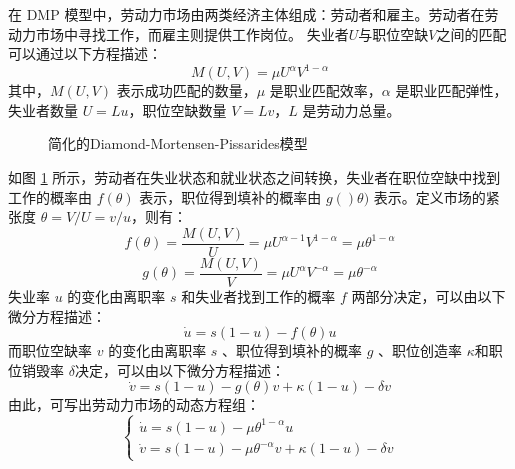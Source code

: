 \documentclass{article}
\begin{document}
在 DMP 模型中，劳动力市场由两类经济主体组成：劳动者和雇主。劳动者在劳动力市场中寻找工作，而雇主则提供工作岗位。
失业者$U$与职位空缺$V$之间的匹配可以通过以下方程描述：
\begin{equation}
    M(U, V) = \mu U^\alpha V^{1-\alpha}
\end{equation}
其中，$M(U, V)$ 表示成功匹配的数量，$\mu$ 是职业匹配效率，$\alpha$ 是职业匹配弹性，失业者数量 $U = L u$，职位空缺数量 $V = L v$，$L$ 是劳动力总量。
\begin{figure}[htbp]
    \centering
    \caption{简化的Diamond-Mortensen-Pissarides模型}
    \label{fig:dmp}
\end{figure}
如图 \ref{fig:dmp} 所示，劳动者在失业状态和就业状态之间转换，失业者在职位空缺中找到工作的概率由 $f(\theta)$ 表示，职位得到填补的概率由 $g()\theta)$ 表示。定义市场的紧张度 $\theta = V / U = v / u$，则有：
\begin{equation}
    f(\theta) = \frac{M(U, V)}{U} = \mu U^{\alpha-1} V^{1-\alpha} = \mu \theta^{1-\alpha}
\end{equation}
\begin{equation}
    g(\theta) = \frac{M(U, V)}{V} = \mu U^\alpha V^{-\alpha} = \mu \theta^{-\alpha}
\end{equation}
失业率 $u$ 的变化由离职率 $s$ 和失业者找到工作的概率 $f$ 两部分决定，可以由以下微分方程描述：
\begin{equation}
    \dot{u} = s(1 - u) - f(\theta) u
\end{equation}
而职位空缺率 $v$ 的变化由离职率 $s$ 、职位得到填补的概率 $g$ 、职位创造率 $\kappa$和职位销毁率 $\delta$决定，可以由以下微分方程描述：
\begin{equation}
    \dot{v} = s(1 - u) - g(\theta) v + \kappa (1 - u) - \delta v
\end{equation}
由此，可写出劳动力市场的动态方程组：
\begin{equation}
    \begin{cases}
        \dot{u}= s(1 - u) - \mu \theta^{1-\alpha} u \\
        \dot{v}= s(1 - u) - \mu \theta^{-\alpha} v + \kappa (1 - u) - \delta v
    \end{cases}
    \label{eq:dmp}
\end{equation}
\end{document}
